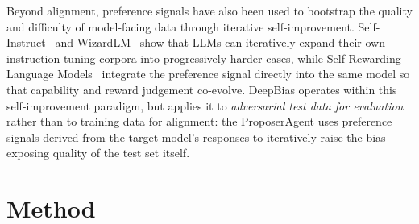 \documentclass[lettersize,journal]{IEEEtran}
\begin{document}
Beyond alignment, preference signals have also been used to bootstrap the quality and difficulty of model-facing data through iterative self-improvement.
Self-Instruct~\cite{wang2023self} and WizardLM~\cite{xu2023wizardlm} show that LLMs can iteratively expand their own instruction-tuning corpora into progressively harder cases, while Self-Rewarding Language Models~\cite{yuan2024selfrewarding} integrate the preference signal directly into the same model so that capability and reward judgement co-evolve.
DeepBias operates within this self-improvement paradigm, but applies it to \emph{adversarial test data for evaluation} rather than to training data for alignment: the ProposerAgent uses preference signals derived from the target model's responses to iteratively raise the bias-exposing quality of the test set itself.




\section{Method}
\label{sec:method}
\end{document}
